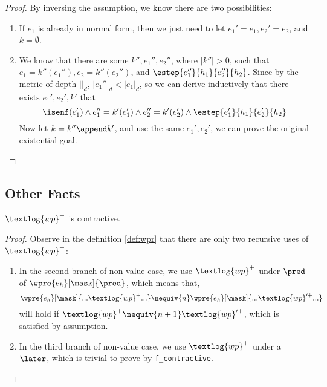 \begin{proof}
    By inversing the assumption, we know there are two possibilities:
    \begin{enumerate}
    \item If $e_1$ is already in normal form, then we just need to let $e_1' = e_1, e_2' = e_2$, and $k = \emptyset$.
    \item We know that there are some $k'', e_1'', e_2''$, where $|k''| > 0$, such that $e_1 = k''(e_1''), e_2 = k''(e_2'')$,
          and $\estep{e_1''}{h_1}{e_2''}{h_2}$. Since by the metric of depth $||_d$, $|e_1''|_d < |e_1|_d$,
          so we can derive inductively that there exists $e_1', e_2', k'$ that
          \[\isenf(e_1') \land e_1'' = k'(e_1') \land e_2'' = k'(e_2') \land \estep{e_1'}{h_1}{e_2'}{h_2}\]
          Now let $k = k '' \append k'$, and use the same $e_1', e_2'$, we can prove the original existential goal.
    \end{enumerate}
\end{proof}

\subsection{Other Facts}

\begin{lemma}
$\textlog{wp}^{+}$ is contractive.
\end{lemma}
\begin{proof}
  Observe in the definition \ref{def:wpr} that there are only two recursive uses of $\textlog{wp}^{+}$:
  \begin{enumerate}
    \item In the second branch of non-value case, we use $\textlog{wp}^{+}$ under $\pred$ of $\wpre{e_h}[\mask]{\pred}$,
    which means that, 
    \[\wpre{e_h}[\mask]{ ... \textlog{wp}^{+} ... } \nequiv{n} \wpre{e_h}[\mask]{ ... \textlog{wp}'^{+} ... } \]
    will hold if \( \textlog{wp}^{+} \nequiv{n + 1} \textlog{wp}'^{+} \), which is satisfied by assumption.
    \item In the third branch of non-value case, we use $\textlog{wp}^{+}$ under a $\later$, which is trivial to prove
    by \texttt{f\_contractive}.
  \end{enumerate}
\end{proof}
